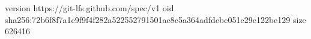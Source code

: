 version https://git-lfs.github.com/spec/v1
oid sha256:72b6f8f7a1c9f9f4f282a522552791501ac8c5a364adfdebc051e29e122be129
size 626416
